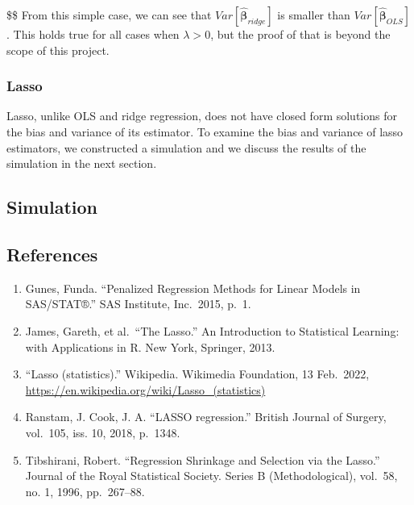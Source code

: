 \documentclass[
]{article}
\begin{document}
\$\$ From this simple case, we can see that
\(Var[\hat{\boldsymbol\beta}_{ridge}]\) is smaller than
\(Var[\hat{\boldsymbol\beta}_{OLS}]\). This holds true for all cases
when \(\lambda>0\), but the proof of that is beyond the scope of this
project.

\hypertarget{lasso-1}{%
\subsubsection{Lasso}\label{lasso-1}}

Lasso, unlike OLS and ridge regression, does not have closed form
solutions for the bias and variance of its estimator. To examine the
bias and variance of lasso estimators, we constructed a simulation and
we discuss the results of the simulation in the next section.

\hypertarget{simulation}{%
\subsection{Simulation}\label{simulation}}

\hypertarget{references}{%
\subsection{References}\label{references}}

\begin{enumerate}
\def\labelenumi{\arabic{enumi}.}
\item
  Gunes, Funda. ``Penalized Regression Methods for Linear Models in
  SAS/STAT®.'' SAS Institute, Inc.~2015, p.~1.
\item
  James, Gareth, et al.~``The Lasso.'' An Introduction to Statistical
  Learning: with Applications in R. New York, Springer, 2013.
\item
  ``Lasso (statistics).'' Wikipedia. Wikimedia Foundation, 13 Feb.~2022,
  \url{https://en.wikipedia.org/wiki/Lasso_(statistics)}
\item
  Ranstam, J. Cook, J. A. ``LASSO regression.'' British Journal of
  Surgery, vol.~105, iss. 10, 2018, p.~1348.
\item
  Tibshirani, Robert. ``Regression Shrinkage and Selection via the
  Lasso.'' Journal of the Royal Statistical Society. Series B
  (Methodological), vol.~58, no. 1, 1996, pp.~267--88.
\end{enumerate}
\end{document}
